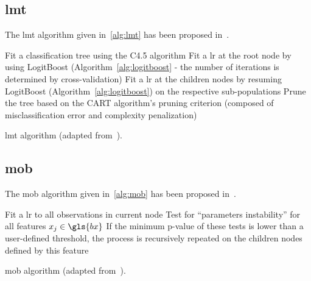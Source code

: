 \subsection{\gls{lmt}} \label{app1:sec_lmt}

The \gls{lmt} algorithm given in~\eqref{alg:lmt} has been proposed in~\cite{landwehr2005logistic}.

\begin{algorithm}[H]
 Fit a classification tree using the C4.5 algorithm\;
 Fit a \gls{lr} at the root node by using LogitBoost (Algorithm~\ref{alg:logitboost} - the number of iterations is determined by cross-validation)\;
 Fit a \gls{lr} at the children nodes by resuming LogitBoost (Algorithm~\ref{alg:logitboost}) on the respective sub-populations\;
 Prune the tree based on the CART algorithm's pruning criterion (composed of misclassification error and complexity penalization)\;
 \caption{\label{alg:lmt} \gls{lmt} algorithm (adapted from~\cite{landwehr2005logistic}).}
\end{algorithm}

\subsection{\gls{mob}} \label{app1:sec_mob}

The \gls{mob} algorithm given in~\eqref{alg:mob} has been proposed in~\cite{zeileis2008model}.

\begin{algorithm}[H]
 Fit a \gls{lr} to all observations in current node\;
 Test for ``parameters instability'' for all features $x_j \in \gls{bx}$\;
 If the minimum p-value of these tests is lower than a user-defined threshold, the process is recursively repeated on the children nodes defined by this feature\;
 \caption{\label{alg:mob} \gls{mob} algorithm (adapted from~\cite{zeileis2008model}).}
\end{algorithm}

\printbibliography[heading=subbibliography, title=References of Appendix A]
